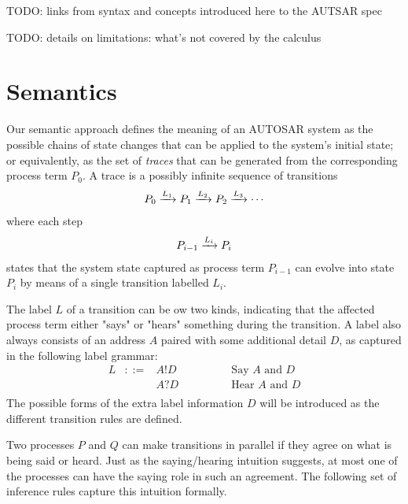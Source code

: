 \documentclass[twocolumn]{article}
\begin{document}
TODO: links from syntax and concepts introduced here to the AUTSAR spec

TODO: details on limitations: what's not covered by the calculus

\section{Semantics}
\label{sec:Sem}

Our semantic approach defines the meaning of an AUTOSAR system as the possible chains of state changes that can be applied to the system's initial state; or equivalently, as the set of \emph{traces} that can be generated from the corresponding process term $P_0$. A trace is a possibly infinite sequence of transitions
\[
\begin{array}{c}
	P_0 \xrightarrow{L_1} P_1 \xrightarrow{L_2} P_2 \xrightarrow{L_3} \cdots
\end{array}
\]
where each step
\[
\begin{array}{c}
	P_{i-1} \xrightarrow{L_i} P_i
\end{array}
\]
states that the system state captured as process term $P_{i-1}$ can evolve into state $P_i$ by means of a single transition labelled $L_i$.


The label $L$ of a transition can be ow two kinds, indicating that the affected process term either "says" or "hears" something during the transition. A label also always consists of an address $A$ paired with some additional detail $D$, as captured in the following label grammar:
\[
\begin{array}{rcll}
	L	& ::=		& A!D		& \hspace{4em}\text{Say $A$ and $D$} \\
		&		& A?D		& \hspace{4em}\text{Hear $A$ and $D$} \\
\end{array}
\]
The possible forms of the extra label information $D$ will be introduced as the different transition rules are defined.

Two processes $P$ and $Q$ can make transitions in parallel if they agree on what is being said or heard. Just as the saying/hearing intuition suggests, at most one of the processes can have the saying role in such an agreement. The following set of inference rules capture this intuition formally.
\end{document}
